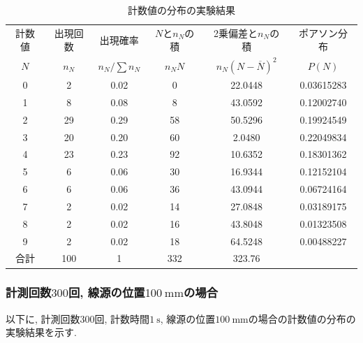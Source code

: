 \documentclass{jarticle}
\begin{document}
\begin{table}[H]
  \centering
  \caption{計数値の分布の実験結果}
  \label{tb:count-distribution-100mm-100times}
  \begin{tabular}{cccccc}
    \hline
    計数値 & 出現回数 & 出現確率 & $N$と$n_N$の積 & 2乗偏差と$n_N$の積 & ポアソン分布 \\
    $N$ & $n_N$ & $n_N/\sum n_N$ & $n_N N$ & $n_N(N-\overline{N})^2$ & $P(N)$ \\
    \hline
    0 & 2 & 0.02 & 0 & 22.0448 & 0.03615283 \\
    1 & 8 & 0.08 & 8 & 43.0592 & 0.12002740 \\
    2 & 29 & 0.29 & 58 & 50.5296 & 0.19924549 \\
    3 & 20 & 0.20 & 60 & 2.0480 & 0.22049834 \\
    4 & 23 & 0.23 & 92 & 10.6352 & 0.18301362 \\
    5 & 6 & 0.06 & 30 & 16.9344 & 0.12152104 \\
    6 & 6 & 0.06 & 36 & 43.0944 & 0.06724164 \\
    7 & 2 & 0.02 & 14 & 27.0848 & 0.03189175 \\
    8 & 2 & 0.02 & 16 & 43.8048 & 0.01323508 \\
    9 & 2 & 0.02 & 18 & 64.5248 & 0.00488227 \\
    \hline
    合計 & 100 & 1 & 332 & 323.76 & \\
    \hline
  \end{tabular}
\end{table}


\subsubsection{計測回数$300$回, 線源の位置$100\ \mathrm{mm}$の場合}

以下に, 計測回数$300$回, 計数時間$1\ \mathrm{s}$, 線源の位置$100\ \mathrm{mm}$の場合の計数値の分布の実験結果を示す.
\end{document}
